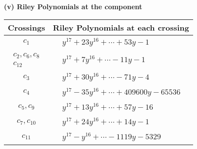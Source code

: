 \documentclass[1p]{elsarticle_modified}
\theoremstyle{definition}
\begin{document}
\newpage\renewcommand{\arraystretch}{1}
\flushleft \textbf{(v) Riley Polynomials at the component}\newline \\
\begin{tabular}{m{50pt}|m{274pt}}
Crossings & \hspace{64pt}Riley Polynomials at each crossing \\
\hline $$\begin{aligned}c_{1}\end{aligned}$$&$\begin{aligned}
&y^{17}+23 y^{16}+\cdots+53 y-1
\end{aligned}$\\
\hline $$\begin{aligned}c_{2},c_{6},c_{8}\\c_{12}\end{aligned}$$&$\begin{aligned}
&y^{17}+7 y^{16}+\cdots-11 y-1
\end{aligned}$\\
\hline $$\begin{aligned}c_{3}\end{aligned}$$&$\begin{aligned}
&y^{17}+30 y^{16}+\cdots-71 y-4
\end{aligned}$\\
\hline $$\begin{aligned}c_{4}\end{aligned}$$&$\begin{aligned}
&y^{17}-35 y^{16}+\cdots+409600 y-65536
\end{aligned}$\\
\hline $$\begin{aligned}c_{5},c_{9}\end{aligned}$$&$\begin{aligned}
&y^{17}+13 y^{16}+\cdots+57 y-16
\end{aligned}$\\
\hline $$\begin{aligned}c_{7},c_{10}\end{aligned}$$&$\begin{aligned}
&y^{17}+24 y^{16}+\cdots+14 y-1
\end{aligned}$\\
\hline $$\begin{aligned}c_{11}\end{aligned}$$&$\begin{aligned}
&y^{17}- y^{16}+\cdots-1119 y-5329
\end{aligned}$\\
\hline
\end{tabular}\\~\\
\end{document}
